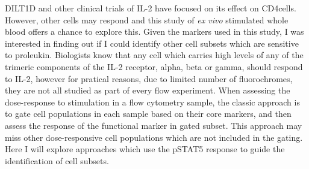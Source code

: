 %

DILT1D and other clinical trials of IL-2 have focused on its effect on CD4\positive cells.
However, other cells may respond and this study of \emph{ex vivo} stimulated whole blood offers a chance to explore this.
Given the markers used in this study, I was interested in finding out if I could identify other cell subsets which are sensitive to proleukin.
Biologists know that any cell which carries high levels of any of the trimeric components of the IL-2 receptor, alpha, beta or gamma,
should respond to IL-2, however for pratical reasons,
due to limited number of fluorochromes,
they are not all studied as part of every flow experiment.  
When assessing the dose-response to stimulation in a flow cytometry sample,
the classic approach is to gate cell populations in each sample based on their core markers,
and then assess the response of the functional marker in gated subset.
This approach may miss other dose-responsive cell populations which are not included in the gating.
Here I will explore approaches which use the pSTAT5 response to guide the identification of cell subsets.

